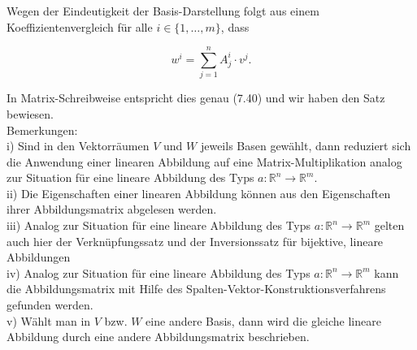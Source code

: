 \documentclass[10pt]{article}
\begin{document}
Wegen der Eindeutigkeit der Basis-Darstellung folgt aus einem Koeffizientenvergleich für alle $i \in\{1, \ldots, m\}$, dass


\begin{equation*}
w^{i}=\sum_{j=1}^{n} A_{j}^{i} \cdot v^{j} . \tag{7.42}
\end{equation*}


In Matrix-Schreibweise entspricht dies genau (7.40) und wir haben den Satz bewiesen.\\
Bemerkungen:\\
i) Sind in den Vektorräumen $V$ und $W$ jeweils Basen gewählt, dann reduziert sich die Anwendung einer linearen Abbildung auf eine Matrix-Multiplikation analog zur Situation für eine lineare Abbildung des Typs $a: \mathbb{R}^{n} \rightarrow \mathbb{R}^{m}$.\\
ii) Die Eigenschaften einer linearen Abbildung können aus den Eigenschaften ihrer Abbildungsmatrix abgelesen werden.\\
iii) Analog zur Situation für eine lineare Abbildung des Typs $a: \mathbb{R}^{n} \rightarrow \mathbb{R}^{m}$ gelten auch hier der Verknüpfungssatz und der Inversionssatz für bijektive, lineare Abbildungen\\
iv) Analog zur Situation für eine lineare Abbildung des Typs $a: \mathbb{R}^{n} \rightarrow \mathbb{R}^{m}$ kann die Abbildungsmatrix mit Hilfe des Spalten-Vektor-Konstruktionsverfahrens gefunden werden.\\
v) Wählt man in $V$ bzw. $W$ eine andere Basis, dann wird die gleiche lineare Abbildung durch eine andere Abbildungsmatrix beschrieben.
\end{document}

